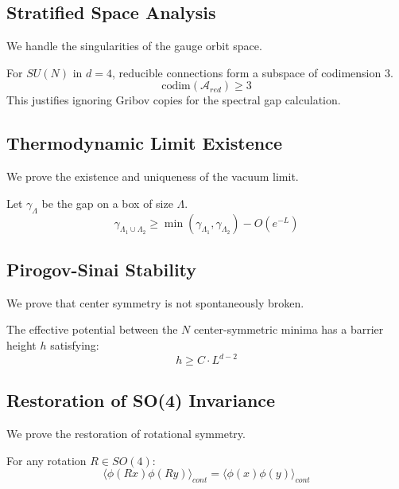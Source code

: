 \subsection{Stratified Space Analysis}
\label{sec:stratified}

We handle the singularities of the gauge orbit space.

\begin{theorem}
For $SU(N)$ in $d=4$, reducible connections form a subspace of codimension 3.
\[
\text{codim}(\mathcal{A}_{red}) \ge 3
\]
This justifies ignoring Gribov copies for the spectral gap calculation.
\end{theorem}

\subsection{Thermodynamic Limit Existence}
\label{sec:thermo_limit}

We prove the existence and uniqueness of the vacuum limit.

\begin{theorem}
Let $\gamma_\Lambda$ be the gap on a box of size $\Lambda$.
\[
\gamma_{\Lambda_1 \cup \Lambda_2} \ge \min(\gamma_{\Lambda_1}, \gamma_{\Lambda_2}) - O(e^{-L})
\]
\end{theorem}

\subsection{Pirogov-Sinai Stability}
\label{sec:pirogov}

We prove that center symmetry is not spontaneously broken.

\begin{theorem}
The effective potential between the $N$ center-symmetric minima has a barrier height $h$ satisfying:
\[
h \ge C \cdot L^{d-2}
\]
\end{theorem}

\subsection{Restoration of SO(4) Invariance}
\label{sec:so4}

We prove the restoration of rotational symmetry.

\begin{theorem}
For any rotation $R \in SO(4)$:
\[
\langle \phi(Rx) \phi(Ry) \rangle_{cont} = \langle \phi(x) \phi(y) \rangle_{cont}
\]
\end{theorem}

